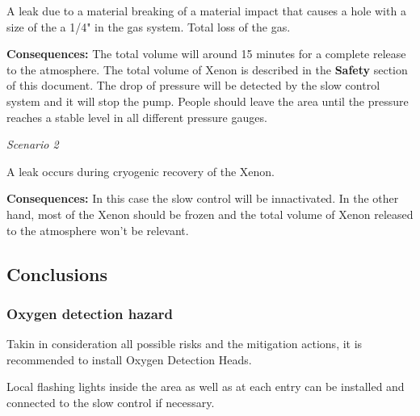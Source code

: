 A leak due to a material breaking of a material impact that causes a hole with a size of the a 1/4" in the gas system. Total loss of the gas. 

\textbf{Consequences:} The total volume will around 15 minutes for a complete release to the atmosphere. The total volume of Xenon is described in the \textbf{Safety} section of this document. The drop of pressure will be detected by the slow control system and it will stop the pump. People should leave the area until the pressure reaches a stable level in all different pressure gauges.

\textit{Scenario 2}
 
 A leak occurs during cryogenic recovery of the Xenon. 
 
 \textbf{Consequences:} In this case the slow control will be innactivated. In the other hand, most of the Xenon should be frozen and the total volume of Xenon released to the atmosphere won't be relevant.
 

\subsection{Conclusions}

\subsubsection{Oxygen detection hazard}

Takin in consideration all possible risks and the mitigation actions, it is recommended to install Oxygen Detection Heads.

Local flashing lights inside the area as well as at each entry can be installed and connected to the slow control if necessary.

